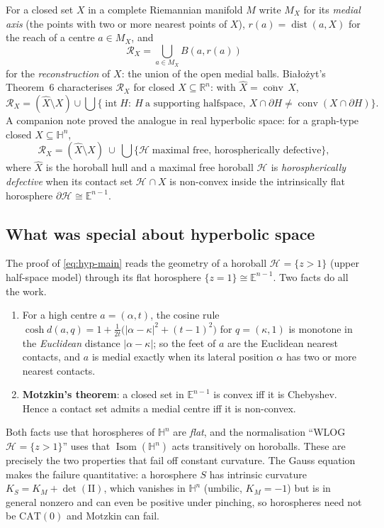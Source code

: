 \documentclass[11pt]{article}
\theoremstyle{remark}
\newcommand{\R}{\mathbb{R}}
\newcommand{\X}{X}
\newcommand{\Xhat}{\widehat{\X}}
\newcommand{\Mx}{M_{\X}}
\newcommand{\Rx}{\mathcal{R}_{\X}}
\newcommand{\Hb}[1]{\mathcal{H}_{#1}}
\newcommand{\dist}{\operatorname{dist}}
\newcommand{\conv}{\operatorname{conv}}
\newcommand{\E}{\mathbb{E}}
\newcommand{\HH}{\mathbb{H}}
\begin{document}
For a closed set $\X$ in a complete Riemannian manifold $M$ write
$\Mx$ for its \emph{medial axis} (the points with two or more nearest
points of $\X$), $r(a)=\dist(a,\X)$ for the reach of a centre
$a\in\Mx$, and
\[
  \Rx=\bigcup_{a\in\Mx}B\!\left(a,r(a)\right)
\]
for the \emph{reconstruction} of $\X$: the union of the open medial
balls. Bia\l{}o\.zyt's Theorem~6 \cite{Bia} characterises $\Rx$ for
closed $\X\subseteq\R^{n}$: with $\Xhat=\overline{\conv}\,\X$,
\[
  \Rx=(\Xhat\setminus\X)\cup\bigcup\bigl\{\operatorname{int}H:\
  H\ \text{a supporting halfspace},\
  \X\cap\partial H\neq\conv(\X\cap\partial H)\bigr\}.
\]
A companion note \cite{R2} proved the analogue in real hyperbolic
space: for a graph-type closed $\X\subseteq\HH^{n}$,
\begin{equation}\label{eq:hyp-main}
  \Rx=(\Xhat\setminus\X)\ \cup\
  \bigcup\bigl\{\Hb{}\ \text{maximal free, horospherically
  defective}\bigr\},
\end{equation}
where $\Xhat$ is the horoball hull and a maximal free horoball $\Hb{}$
is \emph{horospherically defective} when its contact set
$\Hb{}\cap\X$ is non-convex inside the intrinsically flat horosphere
$\partial\Hb{}\cong\E^{n-1}$.

\subsection*{What was special about hyperbolic space}

The proof of \eqref{eq:hyp-main} reads the geometry of a horoball
$\Hb{}=\{z>1\}$ (upper half-space model) through its flat horosphere
$\{z=1\}\cong\E^{n-1}$. Two facts do all the work.
\begin{enumerate}[label=(\alph*)]
\item For a high centre $a=(\alpha,t)$, the cosine rule
$\cosh d(a,q)=1+\tfrac{1}{2t}\bigl(|\alpha-\kappa|^{2}+(t-1)^{2}\bigr)$
for $q=(\kappa,1)$ is monotone in the \emph{Euclidean} distance
$|\alpha-\kappa|$; so the feet of $a$ are the Euclidean nearest
contacts, and $a$ is medial exactly when its lateral position $\alpha$
has two or more nearest contacts.
\item \textbf{Motzkin's theorem}: a closed set in $\E^{n-1}$ is convex
iff it is Chebyshev. Hence a contact set admits a medial centre iff it
is non-convex.
\end{enumerate}
Both facts use that horospheres of $\HH^{n}$ are \emph{flat}, and the
normalisation ``WLOG $\Hb{}=\{z>1\}$'' uses that
$\operatorname{Isom}(\HH^{n})$ acts transitively on horoballs. These
are precisely the two properties that fail off constant curvature. The
Gauss equation makes the failure quantitative: a horosphere $S$ has
intrinsic curvature $K_{S}=K_{M}+\det(\mathrm{II})$, which vanishes in
$\HH^{n}$ (umbilic, $K_{M}=-1$) but is in general nonzero and can even
be positive under pinching, so horospheres need not be
$\mathrm{CAT}(0)$ and Motzkin can fail.
\end{document}
